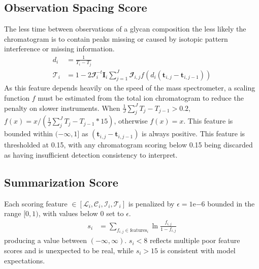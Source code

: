     \subsection{Observation Spacing Score}
        The less time between observations of a glycan composition the less likely the chromatogram
        is to contain peaks missing or caused by isotopic pattern interference or missing information.
        \begin{align}
            d_i &= \frac{1}{T_i - T_j} \nonumber\\
            \mathscr{T}_i &= 1 - 2\mathbfcal{I}_i^{-t}\mathbf{I}_i\sum_{j=1}^J\mathbfcal{I}_{i, j}
                             f\left(d_i\left(\mathbf{t}_{i, j} - \mathbf{t}_{i, j - 1}\right)\right)
        \end{align}
        As this feature depends heavily on the speed of the mass spectrometer, a scaling function $f$
        must be estimated from the total ion chromatogram to reduce the penalty on slower instruments.
        When $\frac{1}{J}\sum_{j}^{J}{T_j - T_{j - 1}} > 0.2$, $f(x) = x / \left(\frac{1}{J}
        \sum_{j}^{J}{T_j - T_{j - 1}} * 15\right)$, otherwise $f(x) = x$. This feature is bounded within
        $(-\infty, 1]$ as $\left(\mathbf{t}_{i, j} - \mathbf{t}_{i, j - 1}\right)$ is always positive.
        This feature is thresholded at 0.15, with any chromatogram scoring below 0.15 being discarded
        as having insufficient detection consistency to interpret.

    \subsection{Summarization Score}
        Each scoring feature $\in \left[\mathscr{L}_i, \mathscr{C}_i, \mathscr{I}_i,
        \mathscr{T}_i\right]$ is penalized by $\epsilon = 1\mathrm{e}{-6}$ bounded in
        the range $[0, 1)$, with values below 0 set to $\epsilon$.
        \begin{align}
            s_i &= \sum_{f_{i,j} \in \text{features}_i}{\ln{
                \frac{f_{i, j}}{1 - f_{i, j}}
                }
            }
        \end{align}
        producing a value between $(-\infty, \infty)$. $s_i < 8$ reflects multiple
        poor feature scores and is unexpected to be real, while $s_i > 15$ is
        consistent with model expectations.

